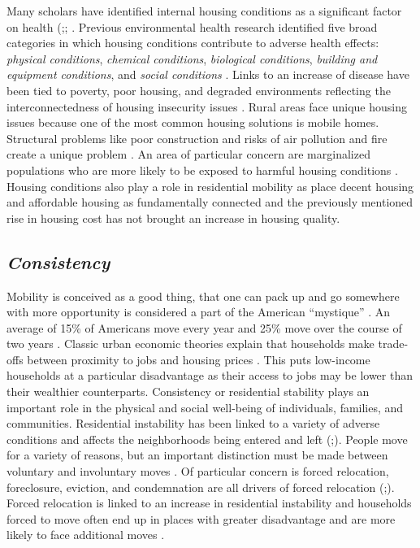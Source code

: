 Many scholars have identified internal housing conditions as a significant factor on health (\citealp{braveman_housing_2011};\citealp{metzger_fair_2017}; \citealp{swope_housing_2020}. Previous environmental health research identified five broad categories in which housing conditions contribute to adverse health effects: \textit{physical conditions}, \textit{chemical conditions}, \textit{biological conditions}, \textit{building and equipment conditions}, and \textit{social conditions} \citep{jacobs_environmental_2011}. Links to an increase of disease have been tied to poverty, poor housing, and degraded environments reflecting the interconnectedness of housing insecurity issues \citep{rauh_housing_2008}. Rural areas face unique housing issues because one of the most common housing solutions is mobile homes. Structural problems like poor construction and risks of air pollution and fire create a unique problem \citep{mactavish_policy_2006}. An area of particular concern are marginalized populations who are more likely to be exposed to harmful housing conditions \citep{swope_housing_2020}. Housing conditions also play a role in residential mobility as \citet{desmond_housing_2015} place decent housing and affordable housing as fundamentally connected and the previously mentioned rise in housing cost has not brought an increase in housing quality.  

\subsection{\textit{Consistency}} 

Mobility is conceived as a good thing, that one can pack up and go somewhere with more opportunity is considered a part of the American “mystique” \citep{molloy_internal_2011}. An average of 15\% of Americans move every year and 25\% move over the course of two years \citep{bachmann_ins_2014}. Classic urban economic theories explain that households make trade-offs between proximity to jobs and housing prices \citep{hu_housing_2019}. This puts low-income households at a particular disadvantage as their access to jobs may be lower than their wealthier counterparts. Consistency or residential stability plays an important role in the physical and social well-being of individuals, families, and communities. Residential instability has been linked to a variety of adverse conditions and affects the neighborhoods being entered and left (\citealp{desmond_forced_2015};\citealp{desmond_housing_2016}). People move for a variety of reasons, but an important distinction must be made between voluntary and involuntary moves \citep{siskar_who_2019}. Of particular concern is forced relocation, foreclosure, eviction, and condemnation are all drivers of forced relocation (\citealp{phinney_exploring_2013};\citealp{siskar_who_2019}). Forced relocation is linked to an increase in residential instability and households forced to move often end up in places with greater disadvantage and are more likely to face additional moves \citep{desmond_forced_2015}. 

